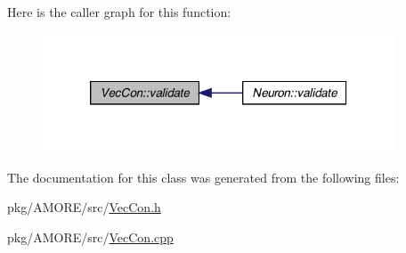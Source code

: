 Here is the caller graph for this function:\nopagebreak
\begin{figure}[H]
\begin{center}
\leavevmode
\includegraphics[width=296pt]{class_vec_con_af008396d3982fb7ccf1af9618b89937c_icgraph}
\end{center}
\end{figure}




The documentation for this class was generated from the following files:\begin{DoxyCompactItemize}
\item 
pkg/AMORE/src/\hyperlink{_vec_con_8h}{VecCon.h}\item 
pkg/AMORE/src/\hyperlink{_vec_con_8cpp}{VecCon.cpp}\end{DoxyCompactItemize}

